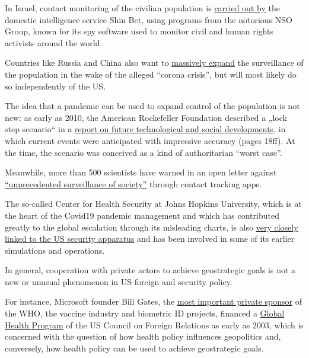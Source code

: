 In Israel, contact monitoring of the civilian population is
\href{https://www.techdirt.com/articles/20200402/14261944226/controversial-spyware-vendor-nso-group-is-helping-israeli-government-spy-own-citizens.shtml}{carried
out by} the domestic intelligence service Shin Bet, using programs from
the notorious NSO Group, known for its spy software used to monitor
civil and human rights activists around the world.

Countries like Russia and China also want to
\href{https://www.npr.org/sections/coronavirus-live-updates/2020/04/01/825329399/moscow-launches-new-surveillance-app-to-track-residents-in-coronavirus-lockdown}{massively
expand} the surveillance of the population in the wake of the alleged
``corona crisis'', but will most likely do so independently of the US.

The idea that a pandemic can be used to expand control of the population
is not new: as early as 2010, the American Rockefeller Foundation
described a „lock step scenario`` in a
\href{https://swprs.files.wordpress.com/2020/04/rockefeller-foundation-scenarios-2010.pdf}{report
on future technological and social developments}, in which current
events were anticipated with impressive accuracy (pages 18ff). At the
time, the scenario was conceived as a kind of authoritarian ``worst
case''.

Meanwhile, more than 500 scientists have warned in an open letter
against
\href{https://www.esat.kuleuven.be/cosic/sites/contact-tracing-joint-statement/}{``unprecedented
surveillance of society''} through contact tracking apps.

The so-called Center for Health Security at Johns Hopkins University,
which is at the heart of the Covid19 pandemic management and which has
contributed greatly to the global escalation through its misleading
charts, is also
\href{http://unlimitedhangout.com/2020/04/investigative-series/all-roads-lead-to-dark-winter/}{very
closely linked to the US security apparatus} and has been involved in
some of its earlier simulations and operations.

In general, cooperation with private actors to achieve geostrategic
goals is not a new or unusual phenomenon in US foreign and security
policy.

For instance, Microsoft founder Bill Gates, the
\href{https://www.youtube.com/watch?v=wQSYdAX_9JY}{most important
private sponsor} of the WHO, the vaccine industry and biometric ID
projects, financed a
\href{https://www.cfr.org/news-releases/council-establishes-senior-fellowship-global-health-and-foreign-policy-grant-bill}{Global
Health Program} of the US Council on Foreign Relations as early as 2003,
which is concerned with the question of how health policy influences
geopolitics and, conversely, how health policy can be used to achieve
geostrategic goals.

